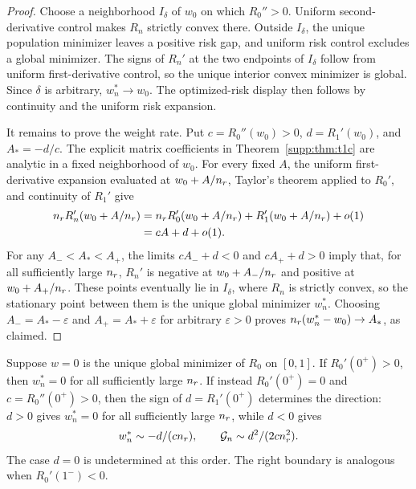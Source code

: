 \begin{proof}
Choose a neighborhood $I_\delta$ of $w_0$ on which $R_0''>0$. Uniform second-derivative control makes $R_n$ strictly convex there. Outside $I_\delta$, the unique population minimizer leaves a positive risk gap, and uniform risk control excludes a global minimizer. The signs of $R_n'$ at the two endpoints of $I_\delta$ follow from uniform first-derivative control, so the unique interior convex minimizer is global. Since $\delta$ is arbitrary, $w_n^*\to w_0$. The optimized-risk display then follows by continuity and the uniform risk expansion.

It remains to prove the weight rate. Put $c=R_0''(w_0)>0$, $d=R_1'(w_0)$, and $A_*=-d/c$. The explicit matrix coefficients in Theorem~\ref{supp:thm:t1c} are analytic in a fixed neighborhood of $w_0$. For every fixed $A$, the uniform first-derivative expansion evaluated at $w_0+A/n_r$, Taylor's theorem applied to $R_0'$, and continuity of $R_1'$ give
\begin{align}
 n_r R_n'(w_0+A/n_r)
 &=n_r R_0'(w_0+A/n_r)+R_1'(w_0+A/n_r)+o(1)\notag\\
 &=cA+d+o(1).
 \label{supp:eq:scaled-optimal-derivative}
\end{align}
For any $A_-<A_*<A_+$, the limits $cA_-+d<0$ and $cA_++d>0$ imply that, for all sufficiently large $n_r$, $R_n'$ is negative at $w_0+A_-/n_r$ and positive at $w_0+A_+/n_r$. These points eventually lie in $I_\delta$, where $R_n$ is strictly convex, so the stationary point between them is the unique global minimizer $w_n^*$. Choosing $A_-=A_*-\varepsilon$ and $A_+=A_*+\varepsilon$ for arbitrary $\varepsilon>0$ proves $n_r(w_n^*-w_0)\to A_*$, as claimed.
\end{proof}

\begin{theorem}\label{supp:thm:boundaryfull}
Suppose $w=0$ is the unique global minimizer of $R_0$ on $[0,1]$. If $R_0'(0^+)>0$, then $w_n^*=0$ for all sufficiently large $n_r$. If instead $R_0'(0^+)=0$ and $c=R_0''(0^+)>0$, then the sign of $d=R_1'(0^+)$ determines the direction: $d>0$ gives $w_n^*=0$ for all sufficiently large $n_r$, while $d<0$ gives
\begin{equation}
 w_n^*\sim-d/(cn_r),\qquad \mathcal G_n\sim d^2/(2cn_r^2).
\end{equation}
The case $d=0$ is undetermined at this order. The right boundary is analogous when $R_0'(1^-)<0$.
\end{theorem}


